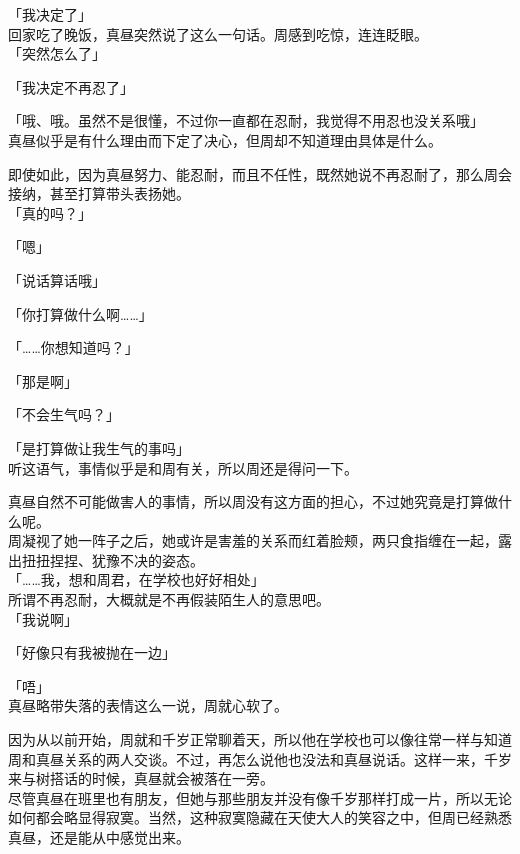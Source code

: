 「我决定了」\\

回家吃了晚饭，真昼突然说了这么一句话。周感到吃惊，连连眨眼。\\

「突然怎么了」

「我决定不再忍了」

「哦、哦。虽然不是很懂，不过你一直都在忍耐，我觉得不用忍也没关系哦」\\

真昼似乎是有什么理由而下定了决心，但周却不知道理由具体是什么。

即使如此，因为真昼努力、能忍耐，而且不任性，既然她说不再忍耐了，那么周会接纳，甚至打算带头表扬她。\\

「真的吗？」

「嗯」

「说话算话哦」

「你打算做什么啊……」

「……你想知道吗？」

「那是啊」

「不会生气吗？」

「是打算做让我生气的事吗」\\

听这语气，事情似乎是和周有关，所以周还是得问一下。

真昼自然不可能做害人的事情，所以周没有这方面的担心，不过她究竟是打算做什么呢。\\

周凝视了她一阵子之后，她或许是害羞的关系而红着脸颊，两只食指缠在一起，露出扭扭捏捏、犹豫不决的姿态。\\

「……我，想和周君，在学校也好好相处」\\

所谓不再忍耐，大概就是不再假装陌生人的意思吧。\\

「我说啊」

「好像只有我被抛在一边」

「唔」\\

真昼略带失落的表情这么一说，周就心软了。

因为从以前开始，周就和千岁正常聊着天，所以他在学校也可以像往常一样与知道周和真昼关系的两人交谈。不过，再怎么说他也没法和真昼说话。这样一来，千岁来与树搭话的时候，真昼就会被落在一旁。\\

尽管真昼在班里也有朋友，但她与那些朋友并没有像千岁那样打成一片，所以无论如何都会略显得寂寞。当然，这种寂寞隐藏在天使大人的笑容之中，但周已经熟悉真昼，还是能从中感觉出来。\\

